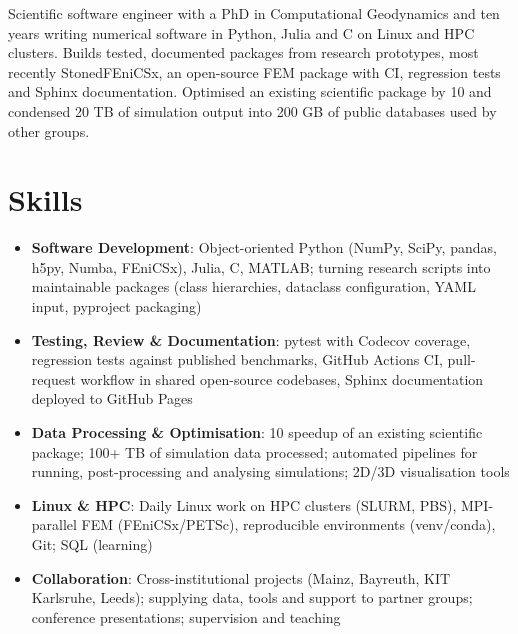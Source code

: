 \documentclass[11pt,a4paper,sans]{moderncv}
\begin{document}
\makecvtitle


\vspace{6pt}
\small{Scientific software engineer with a PhD in Computational Geodynamics and ten years writing numerical software in Python, Julia and C on Linux and HPC clusters. Builds tested, documented packages from research prototypes, most recently StonedFEniCSx, an open-source FEM package with CI, regression tests and Sphinx documentation. Optimised an existing scientific package by 10\texttimes{} and condensed 20 TB of simulation output into 200 GB of public databases used by other groups.}


\section{Skills}
\vspace{1pt}
\begin{itemize}

\item \textbf{Software Development}: Object-oriented Python (NumPy, SciPy, pandas, h5py, Numba, FEniCSx), Julia, C, MATLAB; turning research scripts into maintainable packages (class hierarchies, dataclass configuration, YAML input, pyproject packaging)

\item \textbf{Testing, Review \& Documentation}: pytest with Codecov coverage, regression tests against published benchmarks, GitHub Actions CI, pull-request workflow in shared open-source codebases, Sphinx documentation deployed to GitHub Pages

\item \textbf{Data Processing \& Optimisation}: 10\texttimes{} speedup of an existing scientific package; 100+ TB of simulation data processed; automated pipelines for running, post-processing and analysing simulations; 2D/3D visualisation tools

\item \textbf{Linux \& HPC}: Daily Linux work on HPC clusters (SLURM, PBS), MPI-parallel FEM (FEniCSx/PETSc), reproducible environments (venv/conda), Git; SQL (learning)

\item \textbf{Collaboration}: Cross-institutional projects (Mainz, Bayreuth, KIT Karlsruhe, Leeds); supplying data, tools and support to partner groups; conference presentations; supervision and teaching

\end{itemize}
\end{document}
